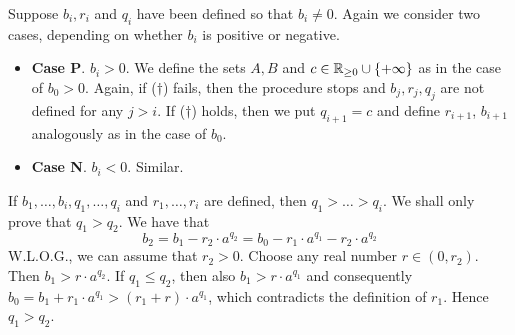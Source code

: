 \documentclass[11pt]{article}
\begin{document}
\begin{center}
\end{center}

Suppose  \(b_i,r_i\) and \(q_i\) have been defined so that \(b_i\neq 0\). Again we consider two cases,
depending on whether \(b_i\) is positive or negative.

\begin{itemize}
\item \textbf{Case P}. \(b_i>0\). We define the sets \(A,B\) and \(c\in\mathbb{R}_{\ge 0}\cup\{+\infty\}\) as in the case of \(b_0>0\).
Again, if (\(\dagger\)) fails, then the procedure stops and \(b_j,r_j,q_j\) are not defined for
any \(j>i\). If (\(\dagger\)) holds, then we put \(q_{i+1}=c\) and define \(r_{i+1}\), \(b_{i+1}\)
analogously as in the case of \(b_0\).

\item \textbf{Case N}. \(b_i<0\). Similar.
\end{itemize}

If \(b_1,\dots,b_i,q_1,\dots,q_i\) and \(r_1,\dots,r_i\) are defined, then \(q_1>\dots>q_i\). We shall only prove
that \(q_1>q_2\). We have that
\begin{equation*}
b_2=b_1-r_2\cdot a^{q_2}=b_0-r_1\cdot a^{q_1}-r_2\cdot a^{q_2}
\end{equation*}
W.L.O.G., we can assume that \(r_2>0\). Choose any real number \(r\in(0,r_2)\).
Then \(b_1>r\cdot a^{q_2}\). If \(q_1\le q_2\), then also \(b_1>r\cdot a^{q_1}\) and
consequently \(b_0=b_1+r_1\cdot a^{q_1}>(r_1+r)\cdot a^{q_1}\), which contradicts the definition of \(r_1\).
Hence \(q_1>q_2\).
\end{document}
